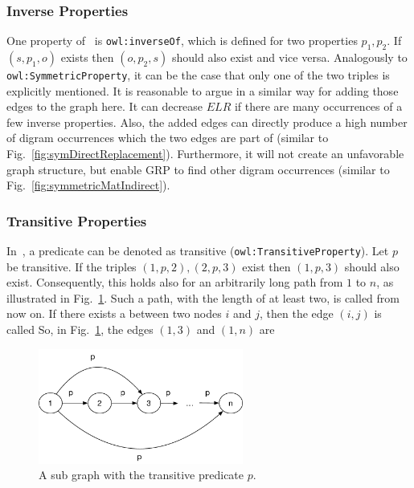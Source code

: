 \subsubsection{Inverse Properties}\label{sec:approachInverse}

One property of~\cite{owl} is {\tt owl:inverseOf}, which is defined for two properties $p_1, p_2$. If $(s,p_1,o)$ exists then $(o,p_2,s)$ should also exist and vice versa. Analogously to {\tt owl:SymmetricProperty}, it can be the case that only one of the two triples is explicitly mentioned. It is reasonable to argue in a similar way for adding those edges to the graph here. It can decrease $ELR$ if there are many occurrences of a few inverse properties. Also, the added edges can directly produce a high number of digram occurrences which the two edges are part of (similar to Fig.~\ref{fig:symDirectReplacement}). Furthermore, it will not create an unfavorable graph structure, but enable GRP to find other digram occurrences (similar to Fig.~\ref{fig:symmetricMatIndirect}).


\subsubsection{Transitive Properties}\label{sec:approachTransitive}

In~\cite{owl}, a predicate can be denoted as transitive ({\tt owl:TransitiveProperty}). Let $p$ be transitive. If the triples $(1,p,2),(2,p,3)$ exist then $(1,p,3)$ should also exist. Consequently, this holds also for an arbitrarily long path from $1$ to $n$, as illustrated in Fig.~\ref{fig:transitiveMat}. Such a path, with the length of at least two, is called \tp from now on. If there exists a \tp between two nodes $i$ and $j$, then the edge $(i,j)$ is called \dtpp So, in Fig.~\ref{fig:transitiveMat}, the edges $(1,3)$ and $(1,n)$ are \dtpsp

\begin{figure}[h]
	\centering
	\includegraphics[width=0.6\textwidth]{figures/approach/transitiveMat}
	\caption{A sub graph with the transitive predicate $p$.}
	\label{fig:transitiveMat}
\end{figure}

